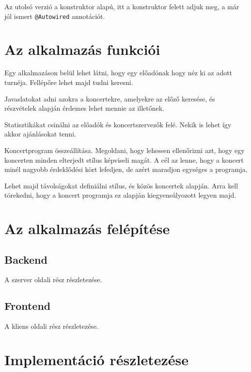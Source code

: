 \documentclass[11pt]{article}
\begin{document}
Az utolsó verzió a konstruktor alapú, itt a konstruktor felett adjuk meg, a már jól ismert \texttt{@Autowired} annotációt.

\section{Az alkalmazás funkciói}

Egy alkalmazáson belül lehet látni, hogy egy előadónak hogy néz ki az adott turnéja. Fellépőre lehet majd tudni keresni.

Javaslatokat adni azokra a koncertekre, amelyekre az előző keresése, és részvételek alapján érdemes lehet mennie az illetőnek.

Statisztikákat csinálni az előadók és koncertszervezők felé. Nekik is lehet így akkor ajánlásokat tenni.

Koncertprogram összeállítása. Megoldani, hogy lehessen ellenőrizni azt, hogy egy koncerten minden elterjedt stílus képviseli magát. A cél az lenne, hogy a koncert minél nagyobb érdeklődési kört lefedjen, de azért maradjon egységes a programja.

Lehet majd távolságokat definiálni stílus, és közös koncertek alapján. Arra kell törekedni, hogy a koncert programja ez alapján kiegyensúlyozott legyen majd.

\section{Az alkalmazás felépítése}

\subsection{Backend}


A szerver oldali rész részletezése.

\subsection{Frontend}

A kliens oldali rész részletezése.

\section{Implementáció részletezése}

\end{document}
